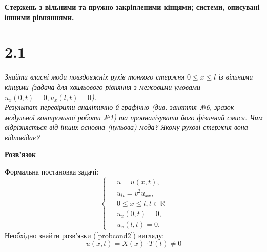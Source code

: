 

%

\textbf{\large Стержень з вільними та пружно закріпленими кінцями; системи, описувані іншими рівняннями.}

\section[Задача №2.1]{2.1}

\textit{Знайти власні моди повздовжніх рухів тонкого стержня $0 \leq x \leq l$ із вільними кінцями  (задача для хвильового рівняння з межовими умовами $u_x(0,t) = 0, u_x(l,t) = 0$).\\
Результат перевірити аналітично й графічно (див. заняття №6, зразок модульної контрольної роботи №1) та проаналізувати його фізичний смисл. Чим відрізняється від інших основна (нульова) мода? Якому рухові стержня вона відповідає?}

\begin{center}
    \large{\textbf{Розв'язок}}
\end{center}

\noindent Формальна постановка задачі:
\begin{equation} \label{probcond2}
    \left\{ \begin{aligned} %
            \;&u = u(x,t), \\
            &u_{tt} = v^2 u_{xx}, \\
            &0 \leq x \leq l, t \in \mathbb{R} \\
            &u_x(0,t) = 0, \\
            &u_x(l,t) = 0. 
    \end{aligned} \right.
\end{equation}
Необхідно знайти розв'язки (\ref{probcond2}) вигляду:
\begin{equation} \label{subst2}
    u(x,t) = X(x) \cdot T(t) \neq 0 
\end{equation}

